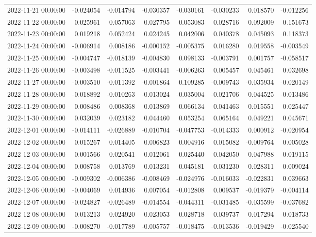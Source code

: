 \begin{tabular}{lrrrrrrr}
2022-11-21 00:00:00 & -0.024054 & -0.014794 & -0.030357 & -0.030161 & -0.030233 & 0.018570 & -0.012256 \\
2022-11-22 00:00:00 & 0.025961 & 0.057063 & 0.027795 & 0.053083 & 0.028716 & 0.092009 & 0.151673 \\
2022-11-23 00:00:00 & 0.019218 & 0.052424 & 0.024245 & 0.042006 & 0.040378 & 0.045093 & 0.118373 \\
2022-11-24 00:00:00 & -0.006914 & 0.008186 & -0.000152 & -0.005375 & 0.016280 & 0.019558 & -0.003549 \\
2022-11-25 00:00:00 & -0.004747 & -0.018139 & -0.004830 & 0.098133 & -0.003791 & 0.001757 & -0.058517 \\
2022-11-26 00:00:00 & -0.003498 & -0.011525 & -0.003441 & -0.006263 & 0.005457 & 0.045461 & 0.032698 \\
2022-11-27 00:00:00 & -0.003510 & -0.011392 & -0.001864 & 0.109285 & -0.009743 & -0.035934 & -0.020149 \\
2022-11-28 00:00:00 & -0.018892 & -0.010263 & -0.013024 & -0.035004 & -0.021706 & 0.044525 & -0.013486 \\
2022-11-29 00:00:00 & 0.008486 & 0.008368 & 0.013869 & 0.066134 & 0.041463 & 0.015551 & 0.025447 \\
2022-11-30 00:00:00 & 0.032039 & 0.023182 & 0.044460 & 0.053254 & 0.065164 & 0.049221 & 0.045671 \\
2022-12-01 00:00:00 & -0.014111 & -0.026889 & -0.010704 & -0.047753 & -0.014333 & 0.000912 & -0.020954 \\
2022-12-02 00:00:00 & 0.015267 & 0.014405 & 0.006823 & 0.004916 & 0.015082 & -0.009764 & 0.005028 \\
2022-12-03 00:00:00 & 0.001566 & -0.020541 & -0.012061 & -0.025440 & -0.042050 & -0.047988 & -0.019115 \\
2022-12-04 00:00:00 & 0.008758 & 0.013769 & 0.013231 & 0.045181 & 0.031230 & 0.028311 & 0.009024 \\
2022-12-05 00:00:00 & -0.009302 & -0.006386 & -0.008469 & -0.024976 & -0.016033 & -0.022831 & 0.039663 \\
2022-12-06 00:00:00 & -0.004069 & 0.014936 & 0.007054 & -0.012808 & 0.009537 & -0.019379 & -0.004114 \\
2022-12-07 00:00:00 & -0.024827 & -0.026489 & -0.014554 & -0.044311 & -0.031485 & -0.035599 & -0.037682 \\
2022-12-08 00:00:00 & 0.013213 & 0.024920 & 0.023053 & 0.028718 & 0.039737 & 0.017294 & 0.018733 \\
2022-12-09 00:00:00 & -0.008270 & -0.017789 & -0.005757 & -0.018475 & -0.013536 & -0.019429 & -0.025540 \\

\end{tabular}

